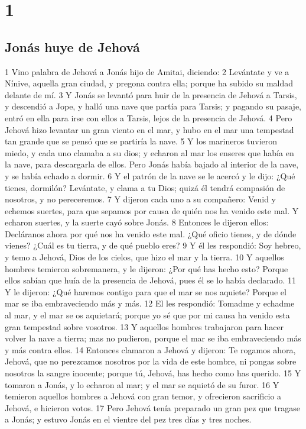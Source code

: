 
\chapter{1}

\section*{Jonás huye de Jehová}

1 Vino palabra de Jehová a Jonás hijo de Amitai, diciendo:
2 Levántate y ve a Nínive, aquella gran ciudad, y pregona contra ella; porque ha subido su maldad delante de mí.
3 Y Jonás se levantó para huir de la presencia de Jehová a Tarsis, y descendió a Jope, y halló una nave que partía para Tarsis; y pagando su pasaje, entró en ella para irse con ellos a Tarsis, lejos de la presencia de Jehová.
4 Pero Jehová hizo levantar un gran viento en el mar, y hubo en el mar una tempestad tan grande que se pensó que se partiría la nave.
5 Y los marineros tuvieron miedo, y cada uno clamaba a su dios; y echaron al mar los enseres que había en la nave, para descargarla de ellos. Pero Jonás había bajado al interior de la nave, y se había echado a dormir.
6 Y el patrón de la nave se le acercó y le dijo: ¿Qué tienes, dormilón? Levántate, y clama a tu Dios; quizá él tendrá compasión de nosotros, y no pereceremos.
7 Y dijeron cada uno a su compañero: Venid y echemos suertes, para que sepamos por causa de quién nos ha venido este mal. Y echaron suertes, y la suerte cayó sobre Jonás.
8 Entonces le dijeron ellos: Decláranos ahora por qué nos ha venido este mal. ¿Qué oficio tienes, y de dónde vienes? ¿Cuál es tu tierra, y de qué pueblo eres?
9 Y él les respondió: Soy hebreo, y temo a Jehová, Dios de los cielos, que hizo el mar y la tierra.
10 Y aquellos hombres temieron sobremanera, y le dijeron: ¿Por qué has hecho esto? Porque ellos sabían que huía de la presencia de Jehová, pues él se lo había declarado.
11 Y le dijeron: ¿Qué haremos contigo para que el mar se nos aquiete? Porque el mar se iba embraveciendo más y más.
12 El les respondió: Tomadme y echadme al mar, y el mar se os aquietará; porque yo sé que por mi causa ha venido esta gran tempestad sobre vosotros. 
13 Y aquellos hombres trabajaron para hacer volver la nave a tierra; mas no pudieron, porque el mar se iba embraveciendo más y más contra ellos.
14 Entonces clamaron a Jehová y dijeron: Te rogamos ahora, Jehová, que no perezcamos nosotros por la vida de este hombre, ni pongas sobre nosotros la sangre inocente; porque tú, Jehová, has hecho como has querido.
15 Y tomaron a Jonás, y lo echaron al mar; y el mar se aquietó de su furor.
16 Y temieron aquellos hombres a Jehová con gran temor, y ofrecieron sacrificio a Jehová, e hicieron votos.
17 Pero Jehová tenía preparado un gran pez que tragase a Jonás; y estuvo Jonás en el vientre del pez tres días y tres noches. 

